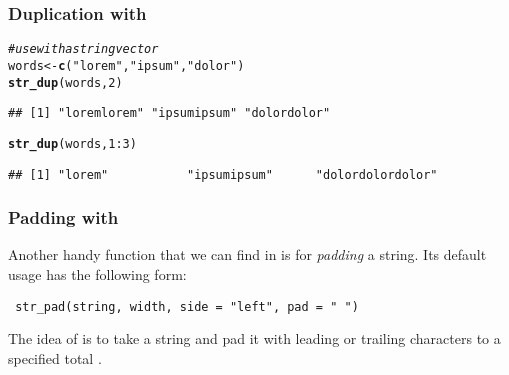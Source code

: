 \documentclass[12pt]{beamer}\usepackage[]{graphicx}\usepackage[]{color}
\makeatletter
\newcommand{\hlnum}[1]{\textcolor[rgb]{0.686,0.059,0.569}{#1}}%
\newcommand{\hlstr}[1]{\textcolor[rgb]{0.192,0.494,0.8}{#1}}%
\newcommand{\hlcom}[1]{\textcolor[rgb]{0.678,0.584,0.686}{\textit{#1}}}%
\newcommand{\hlopt}[1]{\textcolor[rgb]{0,0,0}{#1}}%
\newcommand{\hlstd}[1]{\textcolor[rgb]{0.345,0.345,0.345}{#1}}%
\newcommand{\hlkwb}[1]{\textcolor[rgb]{0.69,0.353,0.396}{#1}}%
\newcommand{\hlkwd}[1]{\textcolor[rgb]{0.737,0.353,0.396}{\textbf{#1}}}%
\newenvironment{kframe}{%
 \def\at@end@of@kframe{}%
 \ifinner\ifhmode%
  \def\at@end@of@kframe{\end{minipage}}%
  \begin{minipage}{\columnwidth}%
 \fi\fi%
 \def\FrameCommand##1{\hskip\@totalleftmargin \hskip-\fboxsep
 \colorbox{shadecolor}{##1}\hskip-\fboxsep
     \hskip-\linewidth \hskip-\@totalleftmargin \hskip\columnwidth}%
 \MakeFramed {\advance\hsize-\width
   \@totalleftmargin\z@ \linewidth\hsize
   \@setminipage}}%
 {\par\unskip\endMakeFramed%
 \at@end@of@kframe}
\newenvironment{knitrout}{}{} %
\makeatother
\begin{document}

\begin{frame}[fragile]
\frametitle{Duplication with }

\begin{knitrout}\footnotesize
{}\color{fgcolor}\begin{kframe}
\begin{alltt}
\hlcom{# use with a string vector}
\hlstd{words} \hlkwb{<-} \hlkwd{c}\hlstd{(}\hlstr{"lorem"}\hlstd{,} \hlstr{"ipsum"}\hlstd{,} \hlstr{"dolor"}\hlstd{)}
\hlkwd{str_dup}\hlstd{(words,} \hlnum{2}\hlstd{)}
\end{alltt}
\begin{verbatim}
## [1] "loremlorem" "ipsumipsum" "dolordolor"
\end{verbatim}
\begin{alltt}
\hlkwd{str_dup}\hlstd{(words,} \hlnum{1}\hlopt{:}\hlnum{3}\hlstd{)}
\end{alltt}
\begin{verbatim}
## [1] "lorem"           "ipsumipsum"      "dolordolordolor"
\end{verbatim}
\end{kframe}
\end{knitrout}

\end{frame}


\begin{frame}[fragile]
\frametitle{Padding with }

Another handy function that we can find in  is   for \textit{padding} a string. Its default usage has the following form:
\begin{verbatim}
 str_pad(string, width, side = "left", pad = " ")
\end{verbatim}
The idea of  is to take a string and pad it with leading or trailing characters to a specified total .

\end{frame}

\end{document}
